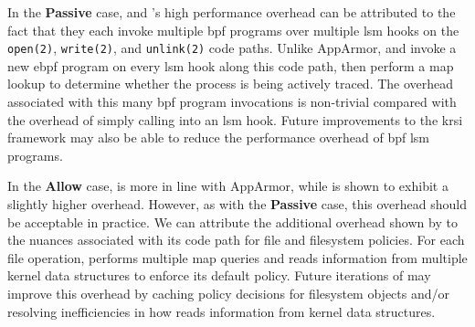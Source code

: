 

In the \textbf{Passive} case, \bpfbox{} and \bpfcontain{}'s high performance overhead can
be attributed to the fact that they each invoke multiple \gls{bpf} programs over multiple
\gls{lsm} hooks on the \texttt{open(2)}, \texttt{write(2)}, and \texttt{unlink(2)} code
paths. Unlike AppArmor, \bpfbox{} and \bpfcontain{} invoke a new \gls{ebpf} program on
every \gls{lsm} hook along this code path, then perform a map lookup to determine whether
the process is being actively traced. The overhead associated with this many \gls{bpf}
program invocations is non-trivial compared with the overhead of simply calling into an
\gls{lsm} hook. Future improvements to the \gls{krsi} framework may also be able to reduce
the performance overhead of \gls{bpf} \gls{lsm} programs.

In the \textbf{Allow} case, \bpfbox{} is more in line with AppArmor, while \bpfcontain{}
is shown to exhibit a slightly higher overhead. However, as with the \textbf{Passive}
case, this overhead should be acceptable in practice. We can attribute the additional
overhead shown by \bpfcontain{} to the nuances associated with its code path for file and
filesystem policies. For each file operation, \bpfcontain{} performs multiple map queries
and reads information from multiple kernel data structures to enforce its default policy.
Future iterations of \bpfcontain{} may improve this overhead by caching policy decisions
for filesystem objects and/or resolving inefficiencies in how \bpfcontain{} reads
information from kernel data structures.

